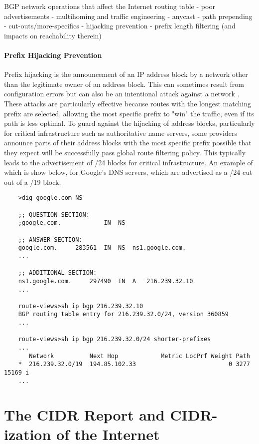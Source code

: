 BGP network operations that affect the Internet routing table
       - poor advertisements
       - multihoming and traffic engineering
	- anycast
	- path prepending
	- cut-outs/more-specifics
       - hijacking prevention
       - prefix length filtering (and impacts on reachability therein)

\paragraph{Prefix Hijacking Prevention}

Prefix hijacking is the announcement of an IP address block by a network other than the legitimate owner of an address block. This can sometimes result from configuration errors \cite{Pakistan-Youtube} but can also be an intentional attack against a network \cite{DEFCON prefix hijack}. These attacks are particularly effective because routes with the longest matching prefix are selected, allowing the most specific prefix to "win" the traffic, even if its path is less optimal. To guard against the hijacking of address blocks, particularly for critical infrastructure such as authoritative name servers, some providers announce parts of their address blocks with the most specific prefix possible that they expect will be successfully pass global route filtering policy. This typically leads to the advertisement of /24 blocks for critical infrastructure. An example of which is show below, for Google's DNS servers, which are advertised as a /24 cut out of a /19 block.

\begin{verbatim}
	>dig google.com NS

	;; QUESTION SECTION:
	;google.com.			IN	NS

	;; ANSWER SECTION:
	google.com.		283561	IN	NS	ns1.google.com.
	...

	;; ADDITIONAL SECTION:
	ns1.google.com.		297490	IN	A	216.239.32.10
	...

	route-views>sh ip bgp 216.239.32.10
	BGP routing table entry for 216.239.32.0/24, version 360859
	...

	route-views>sh ip bgp 216.239.32.0/24 shorter-prefixes
	...
	   Network          Next Hop            Metric LocPrf Weight Path
	*  216.239.32.0/19  194.85.102.33                          0 3277 15169 i
	...
\end{verbatim}

\section{The CIDR Report and CIDR-ization of the Internet}

